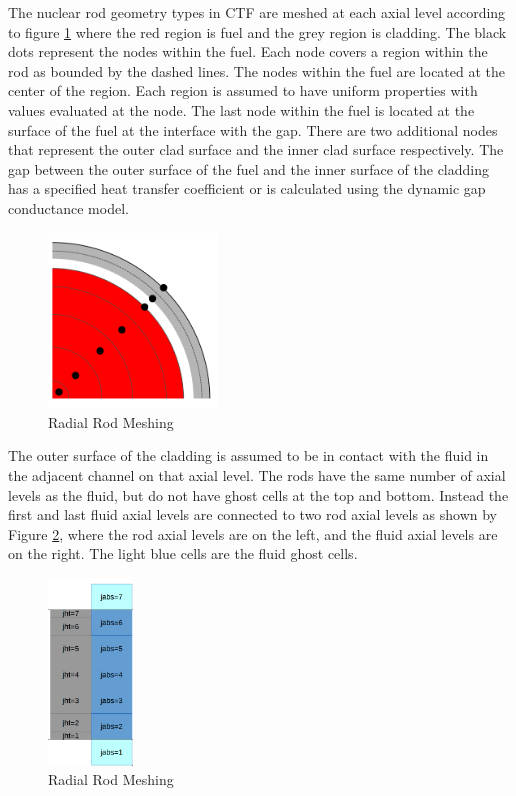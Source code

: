 The nuclear rod geometry types in CTF are meshed at each axial level according
to figure \ref{fig:radial_diagram} where the red region is fuel and the grey
region is cladding. The black dots represent the nodes within the fuel. Each
node covers a region within the rod as bounded by the dashed lines. The nodes
within the fuel are located at the center of the region. Each region is assumed
to have uniform properties with values evaluated at the node. The last node
within  the fuel is located at the surface of the fuel at the interface with the
gap.  There are two additional nodes that represent the outer clad surface and
the inner  clad surface respectively. The gap between the outer surface of the
fuel and the  inner surface of the cladding has a specified heat transfer
coefficient or  is calculated using the dynamic gap conductance model.

	\begin{figure}[!h]
		\centering
		\includegraphics[width=0.40\textwidth]{images/radial_diagram.png}
		\caption{Radial Rod Meshing}
		\label{fig:radial_diagram}
	\end{figure}
	
The outer surface of the cladding is assumed to be in contact with the fluid in
the  adjacent channel on that axial level. The rods have the same number of
axial  levels as the fluid, but do not have ghost cells at the top and bottom.
Instead  the first and last fluid axial levels are connected to two rod axial
levels as  shown by Figure \ref{fig:fluid-solid-meshing}, where the rod axial
levels are on the left, and the fluid  axial levels are on the right. The light
blue cells are the fluid ghost cells.

	\begin{figure}[!h]
		\centering
		\includegraphics[width=0.20\textwidth]{images/fluid-solid-meshing.png}
		\caption{Radial Rod Meshing}
		\label{fig:fluid-solid-meshing}
	\end{figure}

